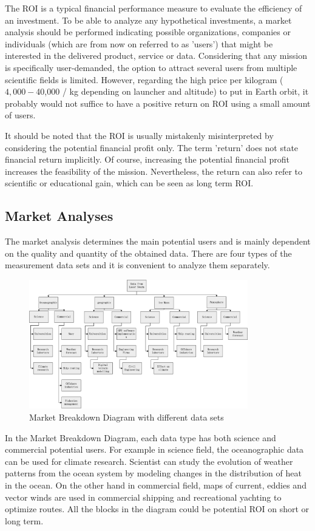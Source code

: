 The \ac{ROI} is a typical financial performance measure to evaluate the efficiency of an investment. To be able to analyze any hypothetical investments, a market analysis should be performed indicating possible organizations, companies or individuals (which are from now on referred to as 'users') that might be interested in the delivered product, service or data. Considering that any mission is specifically user-demanded, the option to attract several users from multiple scientific fields is limited. However, regarding the high price per kilogram ($4,000 - $40,000 / kg depending on launcher and altitude) to put in Earth orbit, it probably would not suffice to have a positive return on \acs{ROI} using a small amount of users. 

It should be noted that the \acs{ROI} is usually mistakenly misinterpreted by considering the potential financial profit only. The term 'return' does not state financial return implicitly. Of course, increasing the potential financial profit increases the feasibility of the mission. Nevertheless, the return can also refer to scientific or educational gain, which can be seen as long term \acs{ROI}. 

\subsection{Market Analyses}
  \label{blMAanalyses}
The market analysis determines the main potential users and is mainly dependent on the quality and quantity of the obtained data. There are four types of the measurement data sets and it is convenient to analyze them separately.
\begin{figure} [h]
	\begin{center}
 \includegraphics[width=0.85\textwidth,angle=0]{chapters/img/Market_analysis.jpg}	
	\caption{Market Breakdown Diagram with different data sets\cite{Market}}
	\label{MA}
	\end{center}
\end{figure}
In the Market Breakdown Diagram, each data type has both science and commercial potential users. For example in science field, the oceanographic data can be used for climate research. Scientist can study the evolution of weather patterns from the ocean system by modeling changes in the distribution of heat in the ocean. On the other hand in commercial field, maps of current, eddies and vector winds are used in commercial shipping and recreational yachting to optimize routes. All the blocks in the diagram could be potential \acs{ROI} on short or long term.

